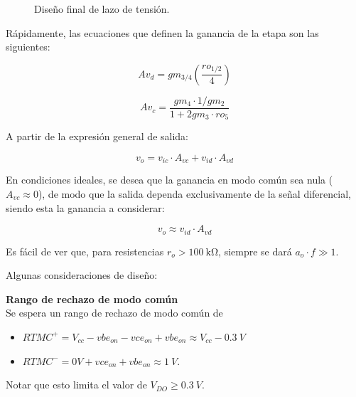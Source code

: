 \documentclass[]{article}
\begin{document}
\begin{figure}[h]
	\caption{Diseño final de lazo de tensión.}
	\label{fig:lazo_tension2}
\end{figure}

Rápidamente, las ecuaciones que definen la ganancia de la etapa son las siguientes:

\begin{equation}
	Av_{d} = gm_{3/4} (\frac{ro_{1/2}}{4})
\end{equation}

\begin{equation}
	Av_{c} = \frac{gm_4 \cdot 1/gm_2}{1+2 gm_3 \cdot ro_5 }
\end{equation}


A partir de la expresión general de salida:

\[
v_o = v_{ic} \cdot A_{vc} + v_{id} \cdot A_{vd}
\]


En condiciones ideales, se desea que la ganancia en modo común sea nula (\(A_{vc} \approx 0\)), de modo que la salida dependa exclusivamente de la señal diferencial, siendo esta la ganancia a considerar:

\[
v_o \approx v_{id} \cdot A_{vd}
\]


Es fácil de ver que, para resistencias $r_o > \SI{100}{\kilo\ohm}$, siempre se dará $a_o \cdot f \gg1$.

Algunas consideraciones de diseño:

\textbf{Rango de rechazo de modo común}\\
Se espera un rango de rechazo de modo común de 
\begin{itemize}
	\item $RTMC^+ = V_{cc} - vbe_{on} - vce_{on} + vbe_{on} \approx V_{cc} - \SI{0.3}{V}$
	\item $RTMC^- = 0V + vce_{on} + vbe_{on} \approx \SI{1}{V}$.
\end{itemize}
Notar que esto limita el valor de $V_{DO} \ge \SI{0.3}{V}$.
\end{document}
